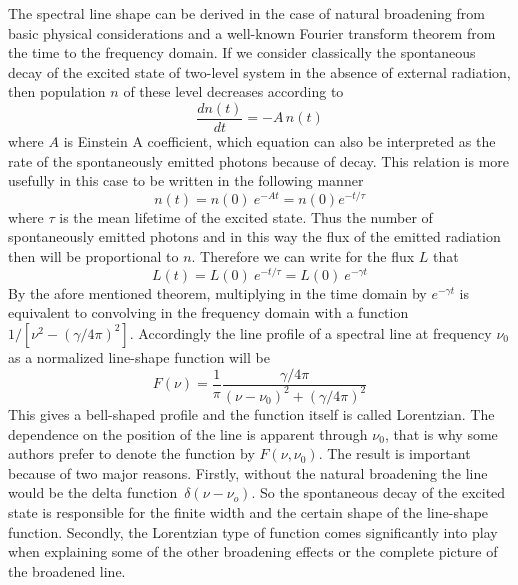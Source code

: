 The spectral line shape can be derived in the case of natural
broadening from basic physical considerations and a well-known Fourier
transform theorem from the time to the frequency domain. If we
consider classically the spontaneous decay of the excited state of
two-level system in the absence of external radiation, then population
$n$ of these level decreases according to
\begin{equation}
  \frac{dn(t)}{dt} = -A\,n(t)
\end{equation}
where $A$ is Einstein A coefficient, which equation can also be
interpreted as the rate of the spontaneously emitted photons because
of decay. This relation is more usefully in this case to be written in
the following manner 
\begin{equation}
  n(t)=n(0)~e^{-At}=n(0)e^{-t/\tau}
\end{equation}
where $ \tau$ is the mean lifetime of the excited state. Thus the
number of spontaneously emitted photons and in this way the flux of
the emitted radiation then will be proportional to $n$. Therefore we
can write for the flux $L$ that
\begin{equation}
  L(t)=L(0)~e^{-t/ \tau}=L(0)~e^{-\gamma t}
\end{equation}
By the afore mentioned theorem, multiplying in the time domain by
$e^{-\gamma t}$ is equivalent to convolving in the frequency domain
with a function $1/[\nu^2 - (\gamma/4\pi)^2]$. Accordingly the line
profile of a spectral line at frequency $ \nu_0$ as a normalized
line-shape function will be
\begin{equation}
  F(\nu)=\frac{1}{\pi}\frac{\gamma/4\pi}{(\nu - \nu_0)^2 + (\gamma/4\pi)^2}
\end{equation}
This gives a bell-shaped profile and the function itself is called
Lorentzian. The dependence on the position of the line is apparent
through $\nu_0$, that is why some authors prefer to denote the function
by $F(\nu,\nu_0)$.  The result is important because of two major reasons.
Firstly, without the natural broadening the line would be the delta
function~$\delta (\nu - \nu_o)$. So the spontaneous decay of
the excited state is responsible for the finite width and the certain
shape of the line-shape function. Secondly, the Lorentzian type of
function comes significantly into play when explaining some of the
other broadening effects or the complete picture of the broadened
line.

